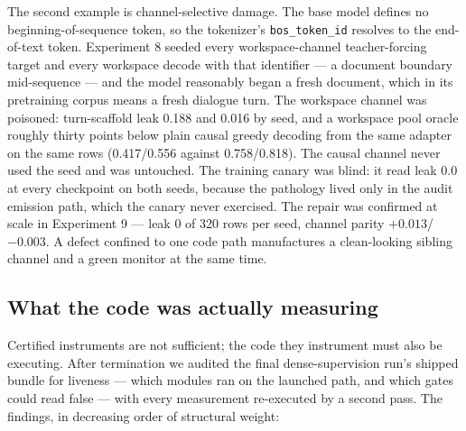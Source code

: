 \documentclass[10pt,a4paper]{article}
\begin{document}
The second example is channel-selective damage. The base model defines no beginning-of-sequence token, so the tokenizer's \texttt{bos\_token\_id} resolves to the end-of-text token. Experiment 8 seeded every workspace-channel teacher-forcing target and every workspace decode with that identifier --- a document boundary mid-sequence --- and the model reasonably began a fresh document, which in its pretraining corpus means a fresh dialogue turn. The workspace channel was poisoned: turn-scaffold leak 0.188 and 0.016 by seed, and a workspace pool oracle roughly thirty points below plain causal greedy decoding from the same adapter on the same rows (0.417/0.556 against 0.758/0.818). The causal channel never used the seed and was untouched. The training canary was blind: it read leak 0.0 at every checkpoint on both seeds, because the pathology lived only in the audit emission path, which the canary never exercised. The repair was confirmed at scale in Experiment 9 --- leak 0 of 320 rows per seed, channel parity $+0.013$/$-0.003$. A defect confined to one code path manufactures a clean-looking sibling channel and a green monitor at the same time.

\subsection{What the code was actually measuring}\label{sec:liveness}

Certified instruments are not sufficient; the code they instrument must also be executing. After termination we audited the final dense-supervision run's shipped bundle for liveness --- which modules ran on the launched path, and which gates could read false --- with every measurement re-executed by a second pass. The findings, in decreasing order of structural weight:
\end{document}

